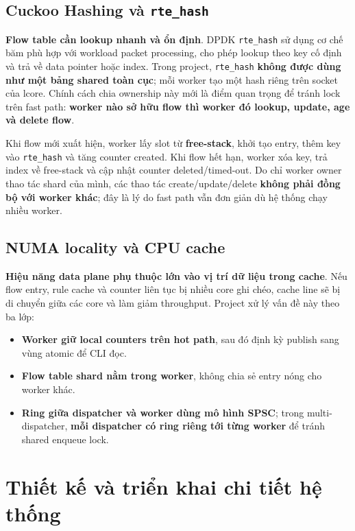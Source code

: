 \documentclass[12pt,a4paper,twoside]{report}
\newcommand{\code}[1]{\texttt{#1}}
\begin{document}
\subsection{Cuckoo Hashing và \code{rte\_hash}}
\textbf{Flow table cần lookup nhanh và ổn định}. DPDK \code{rte\_hash} sử dụng
cơ chế băm phù hợp với workload packet processing, cho phép lookup theo key cố
định và trả về data pointer hoặc index. Trong project, \code{rte\_hash}
\textbf{không được dùng như một bảng shared toàn cục}; mỗi worker tạo một hash
riêng trên socket của lcore. Chính cách chia ownership này mới là điểm quan
trọng để tránh lock trên fast path: \textbf{worker nào sở hữu flow thì worker
đó lookup, update, age và delete flow}.

Khi flow mới xuất hiện, worker lấy slot từ \textbf{free-stack}, khởi tạo entry,
thêm key vào \code{rte\_hash} và tăng counter created. Khi flow hết hạn, worker
xóa key, trả index về free-stack và cập nhật counter deleted/timed-out. Do chỉ
worker owner thao tác shard của mình, các thao tác create/update/delete
\textbf{không phải đồng bộ với worker khác}; đây là lý do fast path vẫn đơn
giản dù hệ thống chạy nhiều worker.

\subsection{NUMA locality và CPU cache}
\textbf{Hiệu năng data plane phụ thuộc lớn vào vị trí dữ liệu trong cache}. Nếu
flow entry, rule cache và counter liên tục bị nhiều core ghi chéo, cache line
sẽ bị di chuyển giữa các core và làm giảm throughput. Project xử lý vấn đề này
theo ba lớp:
\begin{itemize}
    \item \textbf{Worker giữ local counters trên hot path}, sau đó định kỳ
    publish sang vùng atomic để CLI đọc.
    \item \textbf{Flow table shard nằm trong worker}, không chia sẻ entry nóng
    cho worker khác.
    \item \textbf{Ring giữa dispatcher và worker dùng mô hình SPSC}; trong
    multi-dispatcher, \textbf{mỗi dispatcher có ring riêng tới từng worker} để
    tránh shared enqueue lock.
\end{itemize}

\section{Thiết kế và triển khai chi tiết hệ thống}
\end{document}
